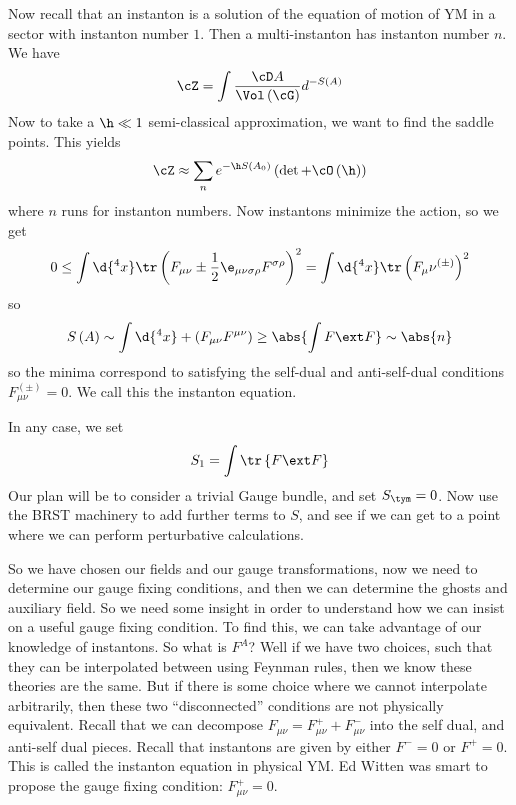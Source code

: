 \documentclass{booc}
\begin{document}
Now recall that an instanton is a solution of the equation of motion of YM in a sector with
instanton number $1$. Then a multi-instanton has instanton number $n$. 
We have
\begin{equation}
\cZ= \int \frac{\cD A}{\Vol\left( \cG \right)} d^{-S\left( A \right)}
\end{equation}
Now to take a $\h \ll 1$ semi-classical approximation, we want to find the saddle
points. This yields
\begin{equation}
\cZ \approx \sum_{n} e^{-\h S\left( A_0 \right)} \left( \det + \cO\left( \h \right) \right)
\end{equation}
where $n$ runs for instanton numbers. Now 
instantons minimize the action, so we get
\begin{equation}
0\leq \int \d{^4 x} \tr\left( F_{\mu\nu} \pm \frac{1}{2} \e_{\mu\nu \sigma\rho} 
F^{\sigma\rho}\right)^2 = 
\int \d{^4 x} \tr\left( F_\mu\nu^{\left( \pm \right)} \right)^2
\end{equation}
so
\begin{equation}
S\left( A \right) \sim \int \d{^4 x} + \left( F_{\mu\nu}F^{\mu\nu} \right) \geq 
\abs{\int F\ext F } \sim \abs{n}
\end{equation}
so the minima correspond to satisfying the self-dual and anti-self-dual 
conditions $F_{\mu\nu}^{\left( \pm \right)} = 0$. We call this the instanton equation.

In any case, we set
\begin{equation}
S_1 = \int \tr\left\{ F\ext F \right\}
\end{equation}
Our plan will be to consider a trivial Gauge bundle, and set $S_{\tym} = 0$.
Now use the BRST machinery to add further terms to $S$, and see
if we can get to a point where we can perform perturbative calculations.

So we have chosen our fields and our gauge transformations,
now we need to determine our gauge fixing conditions, and then we can determine the ghosts
and auxiliary field.
So we need some insight in order to understand how we can insist on a useful gauge fixing condition. 
To find this, we can take advantage of our knowledge of instantons.
So what is $F^A$? Well if we have two choices, such that they can be interpolated between
using Feynman rules, then we know these theories are the same.
But if there is some choice where we cannot interpolate arbitrarily, then these two
``disconnected'' conditions are not physically equivalent. 
Recall that we can decompose $F_{\mu\nu} = F_{\mu\nu}^+ + 
F_{\mu\nu}^-$ into the self dual, and anti-self dual pieces.
Recall that instantons are given by either  $F^- = 0$ or $F^+ = 0$. 
This is called the instanton equation in physical YM. 
Ed Witten was smart to propose the gauge fixing condition: $F_{\mu\nu}^+=0$.
\end{document}

